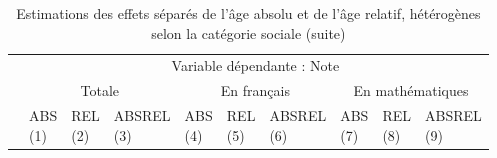 \documentclass[
]{book}
\begin{document}
\begin{landscape}
\begin{ThreePartTable}
\begin{longtable}[t]{llllllllll}
\midrule
\endfirsthead
\caption[]{\label{tab:agemodelsrelpcs}Estimations des effets séparés de l'âge absolu et de l'âge relatif, hétérogènes selon la catégorie sociale (suite)}\\
\toprule
\multicolumn{1}{c}{} & \multicolumn{9}{c}{Variable dépendante : Note} \\
\cmidrule(l{3pt}r{3pt}){2-10}
\multicolumn{1}{c}{} & \multicolumn{3}{c}{Totale} & \multicolumn{3}{c}{En français} & \multicolumn{3}{c}{En mathématiques} \\
\cmidrule(l{3pt}r{3pt}){2-4} \cmidrule(l{3pt}r{3pt}){5-7} \cmidrule(l{3pt}r{3pt}){8-10}
 & \makecell{ABS \\ (1) } & \makecell{REL \\ (2) } & \makecell{ABSREL \\ (3) } & \makecell{ABS \\ (4) } & \makecell{REL \\ (5) } & \makecell{ABSREL \\ (6) } & \makecell{ABS \\ (7) } & \makecell{REL \\ (8) } & \makecell{ABSREL \\ (9) }\\
\midrule
\endhead


\end{longtable}
\end{ThreePartTable}
\end{landscape}
\end{document}
